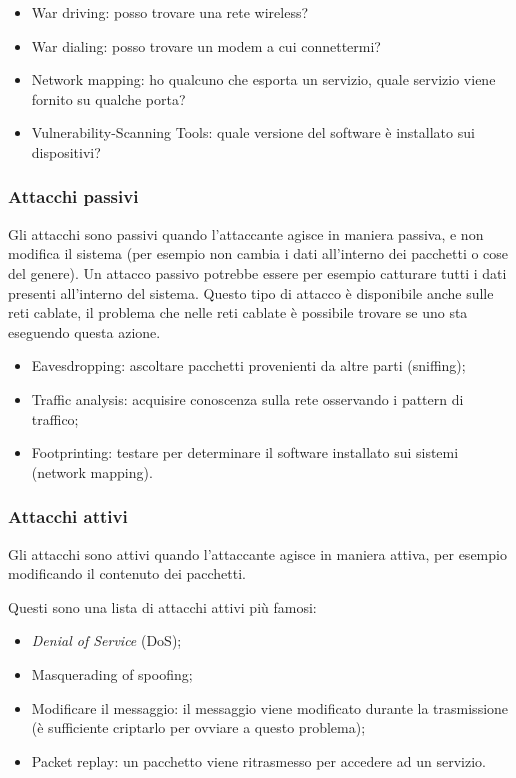 \begin{itemize}
\item War driving: posso trovare una rete wireless?
\item War dialing: posso trovare un modem a cui connettermi?
\item Network mapping: ho qualcuno che esporta un servizio, quale servizio
viene fornito su qualche porta?
\item Vulnerability-Scanning Tools: quale versione del software è installato
sui dispositivi?
\end{itemize}

\subsubsection{Attacchi passivi}

Gli attacchi sono passivi quando l'attaccante agisce in maniera passiva, e non
modifica il sistema (per esempio non cambia i dati all'interno dei pacchetti o
cose del genere). Un attacco passivo potrebbe essere per esempio catturare
tutti i dati presenti all'interno del sistema. Questo tipo di attacco è
disponibile anche sulle reti cablate, il problema che nelle reti cablate è
possibile trovare se uno sta eseguendo questa azione.

\begin{itemize}
\item Eavesdropping: ascoltare pacchetti provenienti da altre parti (sniffing);
\item Traffic analysis: acquisire conoscenza sulla rete osservando i pattern di
traffico;
\item Footprinting: testare per determinare il software installato sui sistemi
(network mapping).
\end{itemize}

\subsubsection{Attacchi attivi}

Gli attacchi sono attivi quando l'attaccante agisce in maniera attiva, per
esempio modificando il contenuto dei pacchetti.

Questi sono una lista di attacchi attivi più famosi:
\begin{itemize}
\item \textit{Denial of Service} (DoS);
\item Masquerading of spoofing;
\item Modificare il messaggio: il messaggio viene modificato durante la
trasmissione (è sufficiente criptarlo per ovviare a questo problema);
\item Packet replay: un pacchetto viene ritrasmesso per accedere ad un
servizio.
\end{itemize}

